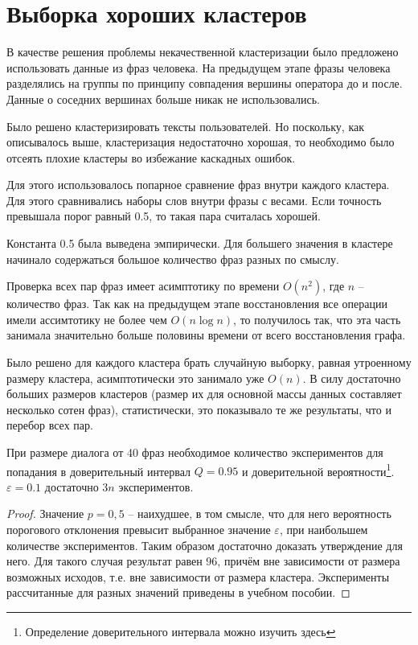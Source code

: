 \documentclass[times,specification,annotation]{itmo-student-thesis}
\begin{document}
	
	\section{Выборка хороших кластеров}
	В качестве решения проблемы некачественной кластеризации было предложено использовать данные из фраз человека. На предыдущем этапе фразы человека разделялись на группы по принципу совпадения вершины оператора до и после. Данные о соседних вершинах больше никак не использовались. 
	
	Было решено кластеризировать тексты пользователей. Но поскольку, как описывалось выше, кластеризация недостаточно хорошая, то необходимо было отсеять плохие кластеры во избежание каскадных ошибок.
	
	Для этого использовалось попарное сравнение фраз внутри каждого кластера. Для этого сравнивались наборы слов внутри фразы с весами. Если точность превышала порог равный 0.5, то такая пара считалась хорошей.
	
	Константа 0.5 была выведена эмпирически. Для большего значения в кластере начинало содержаться большое количество фраз разных по смыслу. 
	
	Проверка всех пар фраз имеет асимптотику по времени $O(n^2)$, где $n$ -- количество фраз. Так как на предыдущем этапе восстановления все операции имели ассимтотику не более чем $O(n \log n)$, то получилось так, что эта часть занимала значительно больше половины времени от всего восстановления графа. 
	
	Было решено для каждого кластера брать случайную выборку, равная утроенному размеру кластера, асимптотически это занимало уже $O(n)$. В силу достаточно больших размеров кластеров (размер их для основной массы данных составляет несколько сотен фраз), статистически, это показывало те же результаты, что и перебор всех пар.
	
	\begin{prop}
		При размере диалога от 40 фраз необходимое количество экспериментов для попадания в доверительный интервал $Q=0.95$ и доверительной вероятности\footnote{Определение доверительного интервала можно изучить здесь\cite{чернова2007теория}}. $\varepsilon=0.1$ достаточно $3n$ экспериментов.
	\end{prop}
	\begin{proof}
		Значение $p=0,5$ -- наихудшее, в том смысле, что для него вероятность порогового отклонения превысит выбранное значение $\varepsilon$, при наибольшем количестве экспериментов. Таким образом достаточно доказать утверждение для него. Для такого случая результат равен 96, причём вне зависимости от размера возможных исходов, т.е. вне зависимости от размера кластера. Эксперименты рассчитанные для разных значений приведены в учебном пособии\cite{мухинмоделирование}.
	\end{proof}
	
\end{document}
